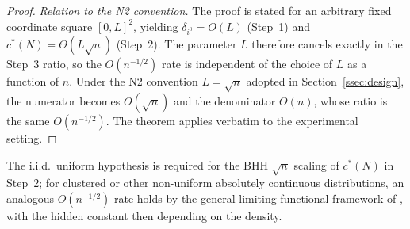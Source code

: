 \documentclass[11pt]{article}
\theoremstyle{plain}
\theoremstyle{definition}
\theoremstyle{remark}
\newcommand{\cstar}{c^{\ast}}
\begin{document}
\begin{proof}
\emph{Relation to the N2 convention.} The proof is stated for an arbitrary fixed coordinate square $[0,L]^2$, yielding $\delta_{i^{0}}=O(L)$ (Step~1) and $\cstar(N)=\Theta(L\sqrt{n})$ (Step~2). The parameter $L$ therefore cancels exactly in the Step~3 ratio, so the $O(n^{-1/2})$ rate is independent of the choice of $L$ as a function of $n$. Under the N2 convention $L=\sqrt{n}$ adopted in Section~\ref{ssec:design}, the numerator becomes $O(\sqrt{n})$ and the denominator $\Theta(n)$, whose ratio is the same $O(n^{-1/2})$. The theorem applies verbatim to the experimental setting.
\end{proof}

\noindent The i.i.d.\ uniform hypothesis is required for the BHH $\sqrt{n}$ scaling of $\cstar(N)$ in Step~2; for clustered or other non-uniform absolutely continuous distributions, an analogous $O(n^{-1/2})$ rate holds by the general limiting-functional framework of \citet{steele1997probability}, with the hidden constant then depending on the density.
\end{document}
